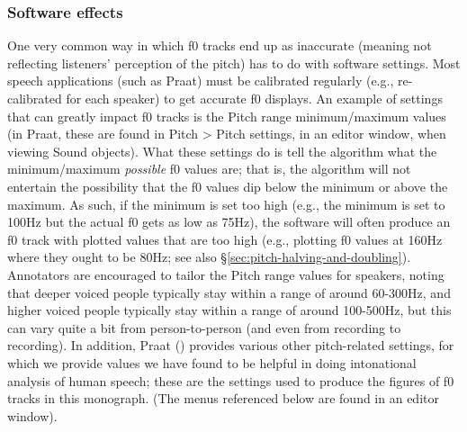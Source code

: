 \documentclass[11pt, twoside]{memoir}
\begin{document}
\subsubsection{Software effects}\label{sec:software-effects}
One very common way in which f0 tracks end up as inaccurate (meaning not reflecting listeners’ perception of the pitch) has to do with software settings. Most speech applications (such as Praat) must be calibrated regularly (e.g., re-calibrated for each speaker) to get accurate f0 displays.
An example of settings that can greatly impact f0 tracks is the Pitch range minimum\slash maximum values (in Praat, these are found in Pitch > Pitch settings, in an editor window, when viewing Sound objects). What these settings do is tell the algorithm what the minimum\slash maximum \emph{possible} f0 values are; that is, the algorithm will not entertain the possibility that the f0 values dip below the minimum or above the maximum. As such, if the minimum is set too high (e.g., the minimum is set to 100Hz but the actual f0 gets as low as 75Hz), the software will often produce an f0 track with plotted values that are too high (e.g., plotting f0 values at 160Hz where they ought to be 80Hz; see also §\ref{sec:pitch-halving-and-doubling}). Annotators are encouraged to tailor the Pitch range values for speakers, noting that deeper voiced people typically stay within a range of around 60-300Hz, and higher voiced people typically stay within a range of around 100-500Hz, but this can vary quite a bit from person-to-person (and even from recording to recording).
In addition, Praat (\citealt{praat}) provides various other pitch-related settings, for which we provide values we have found to be helpful in doing intonational analysis of human speech; these are the settings used to produce the figures of f0 tracks in this monograph. (The menus referenced below are found in an editor window).
\end{document}
